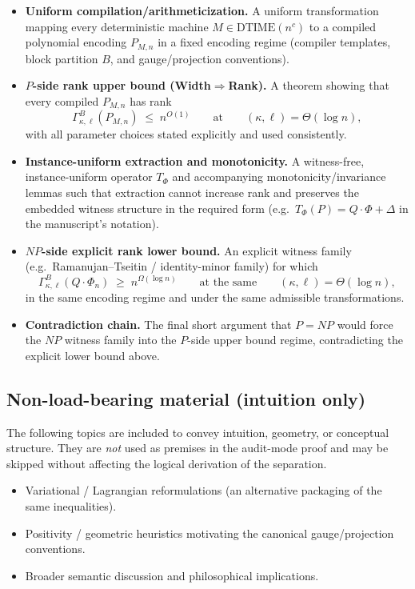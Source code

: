 \documentclass[12pt]{article}
\theoremstyle{definition}
\theoremstyle{definition}
\theoremstyle{remark}
\theoremstyle{remark}
\begin{document}
\begin{itemize}
\item \textbf{Uniform compilation/arithmeticization.}
A uniform transformation mapping every deterministic machine $M\in \mathrm{DTIME}(n^{c})$
to a compiled polynomial encoding $P_{M,n}$ in a fixed encoding regime (compiler templates,
block partition $B$, and gauge/projection conventions).

\item \textbf{$P$-side rank upper bound (Width$\Rightarrow$Rank).}
A theorem showing that every compiled $P_{M,n}$ has rank
\[
\Gamma^{B}_{\kappa,\ell}(P_{M,n}) \;\le\; n^{O(1)}
\qquad\text{at}\qquad (\kappa,\ell)=\Theta(\log n),
\]
with all parameter choices stated explicitly and used consistently.

\item \textbf{Instance-uniform extraction and monotonicity.}
A witness-free, instance-uniform operator $T_{\Phi}$ and accompanying monotonicity/invariance
lemmas such that extraction cannot increase rank and preserves the embedded witness structure
in the required form (e.g.\ $T_{\Phi}(P)=Q\cdot \Phi + \Delta$ in the manuscript's notation).

\item \textbf{$NP$-side explicit rank lower bound.}
An explicit witness family (e.g.\ Ramanujan--Tseitin / identity-minor family) for which
\[
\Gamma^{B}_{\kappa,\ell}(Q\cdot \Phi_n) \;\ge\; n^{\Omega(\log n)}
\qquad\text{at the same}\qquad (\kappa,\ell)=\Theta(\log n),
\]
in the same encoding regime and under the same admissible transformations.

\item \textbf{Contradiction chain.}
The final short argument that $P=NP$ would force the $NP$ witness family into the $P$-side
upper bound regime, contradicting the explicit lower bound above.
\end{itemize}

\subsection{Non-load-bearing material (intuition only)}
\label{subsec:nonloadbearing}

The following topics are included to convey intuition, geometry, or conceptual structure.
They are \emph{not} used as premises in the audit-mode proof and may be skipped without
affecting the logical derivation of the separation.

\begin{itemize}
\item Variational / Lagrangian reformulations (an alternative packaging of the same inequalities).
\item Positivity / geometric heuristics motivating the canonical gauge/projection conventions.
\item Broader semantic discussion and philosophical implications.
\end{itemize}
\end{document}

